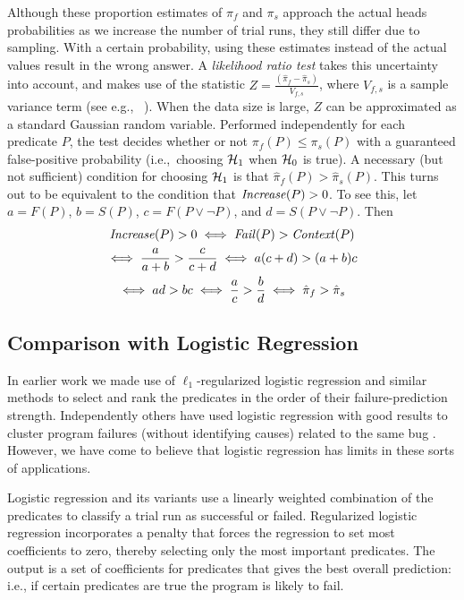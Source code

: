Although these proportion estimates of $\pi_f$ and $\pi_s$ approach the
actual heads probabilities as we increase the number of trial runs, they
still differ due to sampling.  With a certain probability, using these
estimates instead of the actual values result in the wrong
answer.  A \textit{likelihood ratio test} takes this uncertainty into
account, and makes use of the statistic $ Z = \frac{(\hat \pi_f - \hat
  \pi_s)}{V_{f,s}}$, where $V_{f,s}$ is a sample variance term (see
e.g., ~\cite{Lehmann:1986:hyptest}).  When
the data size is large, $Z$ can be approximated as a standard Gaussian
random variable.  Performed independently for each predicate $P$, the
test decides whether or not $\pi_f(P) \leq \pi_s(P)$ with a guaranteed
false-positive probability (i.e.,\ choosing ${\mathcal{H}}_1$ when ${\mathcal{H}}_0$ is true).
A necessary (but not sufficient) condition for choosing ${\mathcal{H}}_1$ is that
$\hat \pi_f(P) > \hat \pi_s(P)$.  This turns out to be
equivalent to the condition that $\mbox{\textit{Increase}}(P) > 0$.  To see this,
let $a = F(P)$, $b = S(P)$, $c = F(P\lor\lnot P)$, and $d = S(P\lor\lnot P)$.
Then
\begin{gather*}
  \mbox{\textit{Increase}}(P) > 0 \iff \mbox{\textit{Fail}}(P) > \mbox{\textit{Context}}(P) \\
  \iff \frac{a}{a+b} > \frac{c}{c+d}
  \iff a (c+d) > (a+b) c \\
  \iff ad > bc \iff \frac{a}{c} > \frac{b}{d}
  \iff \hat \pi_f > \hat \pi_s
\end{gather*}


\subsection{Comparison with Logistic Regression}
\label{sec:comparison}

In earlier work \cite{PLDI`03*141,Zheng:2003:SDSP}
we made use of $\ell_1$-regularized logistic regression and similar
methods to select and rank the predicates in the order of their
failure-prediction strength.  Independently others have used
logistic regression with good results to cluster program failures (without
identifying causes) related to the same bug \cite{ICSE`03*465}.  However, we have come
to believe that logistic regression has limits
in these sorts of applications. 

Logistic regression and its variants use a linearly weighted
combination of the predicates to classify a trial run as successful or
failed.  Regularized logistic regression incorporates a penalty
that forces the regression to set most coefficients to zero, thereby
selecting only the most important predicates.  The output is a set of
coefficients for predicates that gives the best overall prediction: i.e., if
certain predicates are true the program is likely to fail.

